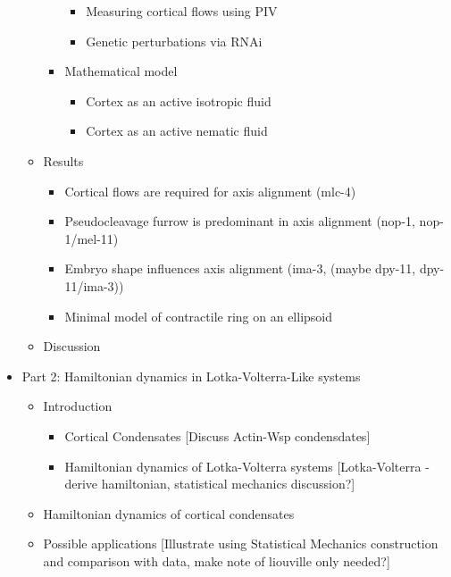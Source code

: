 \documentclass{article}
\begin{document}
\begin{itemize}
\begin{itemize}
\begin{itemize}
\begin{itemize}
            \item Measuring cortical flows using PIV
            \item Genetic perturbations via RNAi
        \end{itemize}
        \item Mathematical model
        \begin{itemize}
            \item Cortex as an active isotropic fluid
            \item Cortex as an active nematic fluid
        \end{itemize}
    \end{itemize}
    \item Results
    \begin{itemize}
        \item Cortical flows are required for axis alignment (mlc-4)
        \item Pseudocleavage furrow is predominant in axis alignment (nop-1, nop-1/mel-11)
        \item Embryo shape influences axis alignment (ima-3, (maybe dpy-11, dpy-11/ima-3))
        \item Minimal model of contractile ring on an ellipsoid
    \end{itemize}
    \item Discussion
    \end{itemize}
    \item Part 2: Hamiltonian dynamics in Lotka-Volterra-Like systems
    \begin{itemize}
        \item Introduction
        \begin{itemize}
            \item Cortical Condensates [Discuss Actin-Wsp condensdates]
            \item Hamiltonian dynamics of Lotka-Volterra systems [Lotka-Volterra - derive hamiltonian, statistical mechanics discussion?]
        \end{itemize}
        \item Hamiltonian dynamics of cortical condensates
        \item Possible applications [Illustrate using Statistical Mechanics construction and comparison with data, make note of liouville only needed?]
    \end{itemize}
\end{itemize}
\end{document}
